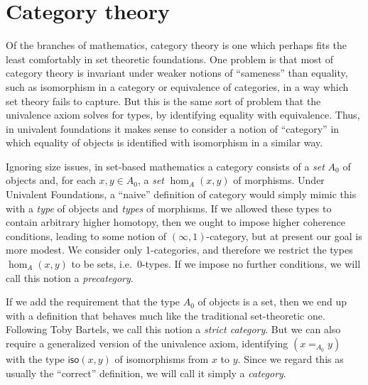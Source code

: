 \chapter{Category theory}
\label{cha:category-theory}

Of the branches of mathematics, category theory is one which perhaps fits the least comfortably in set theoretic foundations.
One problem is that most of category theory is invariant under weaker notions of ``sameness'' than equality, such as isomorphism in a category or equivalence of categories, in a way which set theory fails to capture.
But this is the same sort of problem that the univalence axiom solves for types, by identifying equality with equivalence.
Thus, in univalent foundations it makes sense to consider a notion of ``category'' in which equality of objects is identified with isomorphism in a similar way.

Ignoring size issues, in set-based mathematics a category consists of a \emph{set} $A_0$ of objects and, for each $x,y\in A_0$, a \emph{set} $\hom_A(x,y)$ of morphisms.
Under Univalent Foundations, a ``naive'' definition of category would simply mimic this with a \emph{type} of objects and \emph{types} of morphisms.
If we allowed these types to contain arbitrary higher homotopy, then we ought to impose higher coherence conditions, leading to some notion of $(\infty,1)$-category, but at present our goal is more modest.
We consider only 1-categories, and therefore we restrict the types $\hom_A(x,y)$ to be sets, i.e.\ 0-types.
If we impose no further conditions, we will call this notion a \emph{precategory}.

If we add the requirement that the type $A_0$ of objects is a set, then we end up with a definition that behaves much like the traditional set-theoretic one.
Following Toby Bartels, we call this notion a \emph{strict category}.
But we can also require a generalized version of the univalence axiom, identifying $(x=_{A_0} y)$ with the type $\mathsf{iso}(x,y)$ of isomorphisms from $x$ to $y$.
Since we regard this as usually the ``correct'' definition, we will call it simply a \emph{category}.


